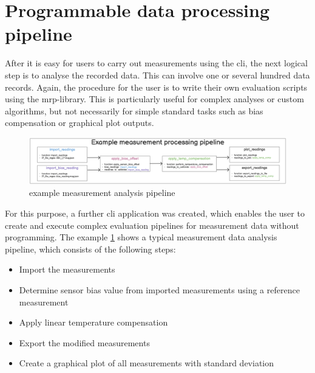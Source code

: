 \hypertarget{programmable-data-processing-pipeline}{%
\section{Programmable data processing
pipeline}\label{programmable-data-processing-pipeline}}

After it is easy for users to carry out measurements using the
\gls{cli}, the next logical step is to analyse the recorded data. This
can involve one or several hundred data records. Again, the procedure
for the user is to write their own evaluation scripts using the
\gls{mrp}-library. This is particularly useful for complex analyses or
custom algorithms, but not necessarily for simple standard tasks such as
bias compensation or graphical plot outputs.

\begin{figure}
\centering
\includegraphics{./generated_images/border_example_measurement_analysis_pipeline.png}
\caption{example measurement analysis pipeline
\label{example_measurement_analysis_pipeline.png}}
\end{figure}

For this purpose, a further \gls{cli} application was created, which
enables the user to create and execute complex evaluation pipelines for
measurement data without programming. The example
\ref{example_measurement_analysis_pipeline.png} shows a typical
measurement data analysis pipeline, which consists of the following
steps:

\begin{itemize}
\tightlist
\item
  Import the measurements
\item
  Determine sensor bias value from imported measurements using a
  reference measurement
\item
  Apply linear temperature compensation
\item
  Export the modified measurements
\item
  Create a graphical plot of all measurements with standard deviation
\end{itemize}

